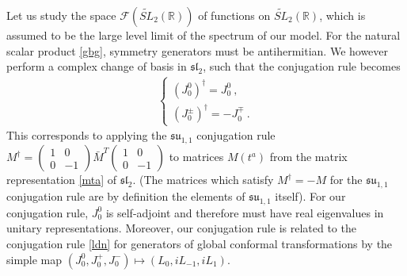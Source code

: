 \documentclass[12pt,a4paper,notitlepage]{report}
\numberwithin{equation}{section}
\theoremstyle{break}
\begin{document}
Let us study the space $\mathcal{F}(\widetilde{SL}_2(\mathbb{R}))$ of functions on $\widetilde{SL}_2(\mathbb{R})$, which is assumed to be the large level limit of the spectrum of our model. 
For the natural scalar product \eqref{gbg}, symmetry generators must be antihermitian.
We however perform a complex change of basis in $\mathfrak{sl}_2$, such that the conjugation rule becomes
\begin{align}
 \left\{\begin{array}{l} (J_0^0)^\dagger = J_0^0\ , \\
         (J_0^\pm)^\dagger = -J_0^\mp \ .
        \end{array}
\right.
\label{jtdj}
\end{align}
This corresponds to applying the $\mathfrak{su}_{1,1}$ conjugation rule $M^\dagger = \left(\begin{smallmatrix} 1 & 0 \\ 0 & -1 \end{smallmatrix}\right) \bar{M}^T \left(\begin{smallmatrix} 1 & 0 \\ 0 & -1 \end{smallmatrix}\right)$ to matrices $M(t^a)$ from the matrix representation \eqref{mta} of $\mathfrak{sl}_2$. (The matrices which satisfy $M^\dagger =-M$ for the $\mathfrak{su}_{1,1}$ conjugation rule are by definition the elements of $\mathfrak{su}_{1,1}$ itself). 
For our conjugation rule, $J_0^0$ is self-adjoint and therefore must have real eigenvalues in unitary representations.
Moreover, our conjugation rule is related to the conjugation rule \eqref{ldn} for generators of 
global conformal transformations by the simple map $(J_0^0,J_0^+,J_0^-)\mapsto(L_0,iL_{-1},iL_1)$.
\end{document}
